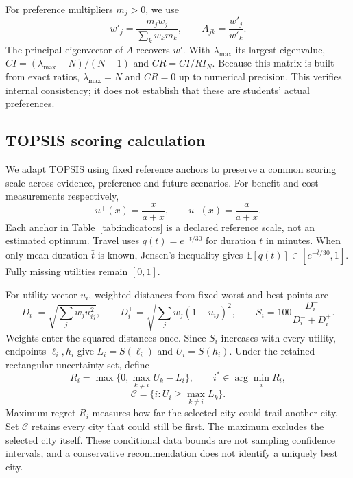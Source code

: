 \documentclass[12pt]{article}
\begin{document}
For preference multipliers $m_j>0$, we use
\begin{equation}
 w'_j=\frac{m_jw_j}{\sum_kw_km_k},\qquad A_{jk}=\frac{w'_j}{w'_k}.
 \label{eq:weights}
\end{equation}
The principal eigenvector of $A$ recovers $w'$. With $\lambda_{\max}$ its
largest eigenvalue, $CI=(\lambda_{\max}-N)/(N-1)$ and $CR=CI/RI_N$.
Because this matrix is built from exact ratios, $\lambda_{\max}=N$ and
$CR=0$ up to numerical precision. This verifies internal consistency;
it does not establish that these are students' actual preferences.

\subsection{TOPSIS scoring calculation}
We adapt TOPSIS \cite{topsis} using fixed reference anchors to preserve a common scoring scale across evidence,
preference and future scenarios. For benefit and cost measurements respectively,
\begin{equation}
 u^{+}(x)=\frac{x}{a+x},\qquad u^{-}(x)=\frac{a}{a+x}.
\end{equation}
Each anchor in Table~\ref{tab:indicators} is a declared reference scale, not
an estimated optimum. Travel uses $q(t)=e^{-t/30}$ for duration $t$ in minutes.
When only mean duration $\bar t$ is known, Jensen's inequality gives
$\mathbb E[q(t)]\in[e^{-\bar t/30},1]$. Fully missing utilities remain $[0,1]$.

For utility vector $u_i$, weighted distances from fixed worst and best points are
\begin{equation}
 D_i^-=\sqrt{\sum_jw_ju_{ij}^2},\qquad
 D_i^+=\sqrt{\sum_jw_j(1-u_{ij})^2},\qquad
 S_i=100\frac{D_i^-}{D_i^-+D_i^+}.
\end{equation}
Weights enter the squared distances once. Since $S_i$ increases with every
utility, endpoints $\ell_i,h_i$ give $L_i=S(\ell_i)$ and $U_i=S(h_i)$.
Under the retained rectangular uncertainty set, define
\begin{equation}
 R_i=\max\{0,\max_{k\ne i}U_k-L_i\},\qquad
 i^*\in\arg\min_iR_i,
 \label{eq:regret}
\end{equation}
\begin{equation}
 \mathcal C=\{i:U_i\geq\max_{k\ne i}L_k\}.
\end{equation}
Maximum regret $R_i$ measures how far the selected city could trail another
city. Set $\mathcal C$ retains every city that could still be first.
The maximum excludes the selected city itself. These conditional data bounds
are not sampling confidence intervals, and a conservative recommendation does
not identify a uniquely best city.
\end{document}
